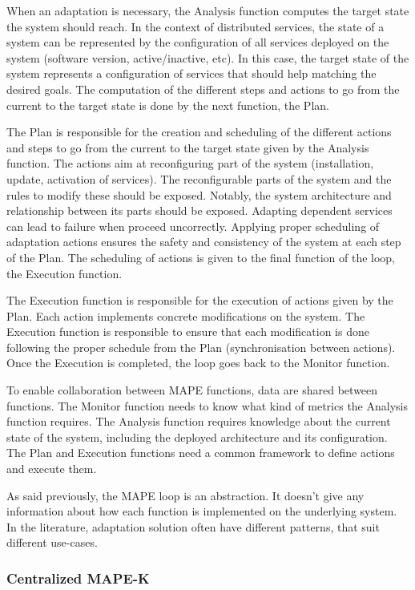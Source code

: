 \documentclass{article}
\begin{document}
When an adaptation is necessary, the Analysis function computes the target state the system should reach. In the context of distributed services, the state of a system can be represented by the configuration of all services deployed on the system (\eg software version, active/inactive, etc). In this case, the target state of the system represents a configuration of services that should help matching the desired goals. The computation of the different steps and actions to go from the current to the target state is done by the next function, the Plan.

The Plan is responsible for the creation and scheduling of the different actions and steps to go from the current to the target state given by the Analysis function. The actions aim at reconfiguring part of the system (\eg installation, update, activation of services). The reconfigurable parts of the system and the rules to modify these should be exposed. Notably, the system architecture and relationship between its parts should be exposed. Adapting dependent services can lead to failure when proceed uncorrectly. Applying proper scheduling of adaptation actions ensures the safety and consistency of the system at each step of the Plan. The scheduling of actions is given to the final function of the loop, the Execution function.

The Execution function is responsible for the execution of actions given by the Plan. Each action implements concrete modifications on the system. The Execution function is responsible to ensure that each modification is done following the proper schedule from the Plan (\eg synchronisation between actions). Once the Execution is completed, the loop goes back to the Monitor function.

To enable collaboration between MAPE functions, data are shared between functions. The Monitor function needs to know what kind of metrics the Analysis function requires. The Analysis function requires knowledge about the current state of the system, including the deployed architecture and its configuration. The Plan and Execution functions need a common framework to define actions and execute them.

As said previously, the MAPE loop is an abstraction. It doesn't give any information about how each function is implemented on the underlying system. In the literature, adaptation solution often have different patterns, that suit different use-cases.
 
\subsubsection{Centralized MAPE-K}
\end{document}

